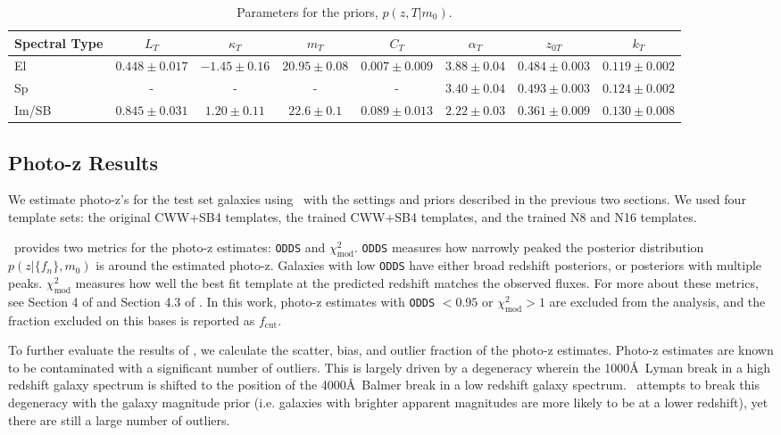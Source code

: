 \begin{table}
    \caption{Parameters for the priors, $p(z,T|m_0)$.}
    \label{tab:prior_params}
    \centering
    \begin{tabular}{l c c c c c c c }
        \hline \hline
         Spectral Type & $L_T$ & $\kappa_T$ & $m_T$ & $C_T$ & $\alpha_T$ & $z_{0T}$ & $k_T$ \\
         \hline
         
         El & $0.448 \pm 0.017$ & $-1.45 \pm 0.16$ & $20.95 \pm 0.08$ & $0.007 \pm 0.009$ & $3.88 \pm 0.04$ & $0.484 \pm 0.003$ & $0.119 \pm 0.002$ \\
         Sp & - & - & - & - & $3.40 \pm 0.04$ & $0.493 \pm 0.003$ & $0.124 \pm 0.002$ \\
         Im/SB & $0.845 \pm 0.031$ & $1.20 \pm 0.11$ & $22.6 \pm 0.1$ & $0.089 \pm 0.013$ & $2.22 \pm 0.03$ & $0.361 \pm 0.009$ & $0.130 \pm 0.008$ \\
        
        \hline
    \end{tabular}
\end{table}


\subsection{Photo-z Results}
\label{sect:photoz_results}

We estimate photo-z's for the test set galaxies using \bpz\ with the settings and priors described in the previous two sections.
We used four template sets: the original CWW+SB4 templates, the trained CWW+SB4 templates, and the trained N8 and N16 templates.

\bpz\ provides two metrics for the photo-z estimates: \texttt{ODDS} and $\chi_{\text{mod}}^2$.
\texttt{ODDS} measures how narrowly peaked the posterior distribution $p(z|\{f_n\},m_0)$ is around the estimated photo-z.
Galaxies with low \texttt{ODDS} have either broad redshift posteriors, or posteriors with multiple peaks.
$\chi_{\text{mod}}^2$ measures how well the best fit template at the predicted redshift matches the observed fluxes. 
For more about these metrics, see Section 4 of \citet{Benitez2000a} and Section 4.3 of \citet{Coe2006a}.
In this work, photo-z estimates with \texttt{ODDS} $< 0.95$ or $\chi_{\text{mod}}^2 > 1$ are excluded from the analysis, and the fraction excluded on this bases is reported as $f_\text{cut}$.

To further evaluate the results of \bpz, we calculate the scatter, bias, and outlier fraction of the photo-z estimates. 
Photo-z estimates are known to be contaminated with a significant number of outliers.
This is largely driven by a degeneracy wherein the 1000\AA\ Lyman break in a high redshift galaxy spectrum is shifted to the position of the 4000\AA\ Balmer break in a low redshift galaxy spectrum. 
\bpz\ attempts to break this degeneracy with the galaxy magnitude prior (i.e. galaxies with brighter apparent magnitudes are more likely to be at a lower redshift), yet there are still a large number of outliers.

